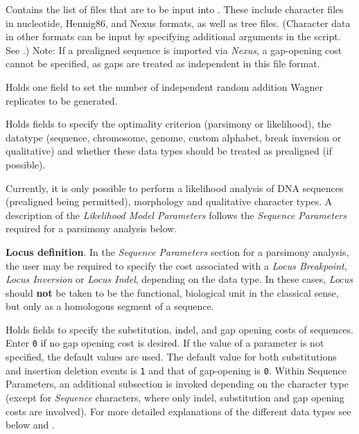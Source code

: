 \begin{description}
\setlength{\parindent}{0.5cm}
    \item[Input Files]
       	 Contains the list of files that are to be input into \poy. These include
       	character files in nucleotide, Hennig86, and Nexus formats, as well as tree files. 
       	(Character data in other formats can be input by specifying additional arguments in the script. 
      	 See .) Note: If a prealigned sequence is imported via \emph{Nexus}, a gap-opening cost cannot be specified, 
      	 as gaps are treated as independent in this file format.
    
    \item[Search Parameters]
        	Holds one field to set the number of independent random addition Wagner replicates to be generated.
    
    \item[Input Parameters]
    	Holds fields to specify the optimality criterion (parsimony or likelihood), the datatype 
	(sequence, chromosome, genome, custom alphabet, break inversion or qualitative) 
	and whether these data types should be treated as prealigned (if possible). 
	
	\indent Currently, it is only possible to perform a likelihood analysis of DNA sequences (prealigned 
	being permitted), morphology and qualitative character types. A description of the \emph{Likelihood 
	Model Parameters} follows the \emph{Sequence Parameters} required for a parsimony analysis below.
	
\begin{statement}
    \textbf{Locus definition}. In the \emph{Sequence Parameters} section for a parsimony analysis, the user may be required 
	to specify the cost associated with a 	\emph{Locus Breakpoint}, \emph{Locus Inversion} or 
	\emph{Locus Indel}, depending on the data type. In these cases, \emph{Locus} should \textbf{not} 
	be taken to be the functional, biological unit in the classical sense, 	but only as a homologous 
	segment of a sequence.
\end{statement}

    \item[Sequence Parameters]
        Holds fields to specify the substitution, indel, and gap opening costs of sequences. Enter \texttt{0} if no
        gap opening cost is desired. If the value of a parameter is not specified, the default values 
        are used. The default value for both substitutions and insertion deletion events is \texttt{1} 
        and that of gap-opening is \texttt{0}. 
        Within Sequence Parameters, an additional subsection is invoked depending on the 
        character type (except for \emph{Sequence} characters, where only indel, substitution 
        and gap opening costs are involved).  For more detailed explanations of the different data types 
        see below and  .
\end{description}   
     
